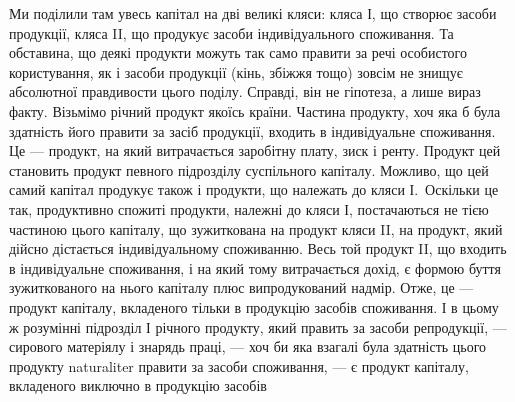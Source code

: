Ми поділили там увесь капітал на дві великі кляси: кляса І, що створює
засоби продукції, кляса II, що продукує засоби індивідуального споживання.
Та обставина, що деякі продукти можуть так само правити за речі особистого
користування, як і засоби продукції (кінь, збіжжя тощо) зовсім не знищує абсолютної
правдивости цього поділу. Справді, він не гіпотеза, а лише вираз факту.
Візьмімо річний продукт якоїсь країни. Частина продукту, хоч яка б була здатність
його правити за засіб продукції, входить в індивідуальне споживання.
Це — продукт, на який витрачається заробітну плату, зиск і ренту. Продукт цей
становить продукт певного підрозділу суспільного капіталу. Можливо, що цей
самий капітал продукує також і продукти, що належать до кляси І.~Оскільки
це так, продуктивно спожиті продукти, належні до кляси І, постачаються не
тією частиною цього капіталу, що зужиткована на продукт кляси II, на продукт,
який дійсно дістається індивідуальному споживанню. Весь той продукт
II, що входить в індивідуальне споживання, і на який тому витрачається
дохід, є формою буття зужиткованого на нього капіталу плюс випродукований
надмір. Отже, це — продукт капіталу, вкладеного тільки в продукцію
засобів споживання. І в цьому ж розумінні підрозділ І річного продукту, який
править за засоби репродукції, — сирового матеріялу і знарядь праці, — хоч би
яка взагалі була здатність цього продукту naturaliter правити за засоби споживання,
— є продукт капіталу, вкладеного виключно в продукцію засобів
\parbreak{}  %
